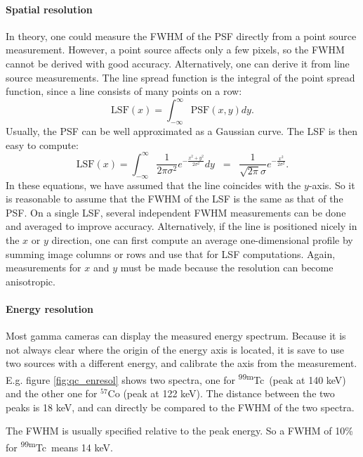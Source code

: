 \documentclass[11pt,oneside]{article}
\begin{document}
\paragraph{Spatial resolution}
In theory, one could measure the FWHM of the PSF directly from a point source
measurement. However, a point source affects only a few pixels, so the FWHM
cannot be derived with good accuracy. Alternatively, one can derive it from
line source measurements. The line spread function is the integral of the
point spread function, since a line consists of many points on a row:
\begin{equation}
  \mbox{LSF}(x) = \int_{-\infty}^{\infty} \mbox{PSF}(x,y) dy.
\end{equation}
Usually, the PSF can be well approximated as a Gaussian curve. The LSF is then
easy to compute:
\begin{equation}
  \mbox{LSF}(x)  =  \int_{-\infty}^{\infty} 
    \frac{1}{2 \pi \sigma^2} e^{- \frac{x^2 + y^2}{2 \sigma^2}} dy
 \;\; = \;\; \frac{1}{\sqrt{2 \pi} \sigma} e^{- \frac{x^2}{2 \sigma^2}}.
\end{equation}
In these equations, we have assumed that the line coincides with the
$y$-axis. So it is reasonable to assume that the FWHM of the LSF is the same
as that of the PSF.  On a single LSF, several independent FWHM measurements
can be done and averaged to improve accuracy. Alternatively, if the line is
positioned nicely in the $x$ or $y$ direction, one can first compute an
average one-dimensional profile by summing image columns or rows and use that
for LSF computations.  Again, measurements for $x$ and $y$ must be made
because the resolution can become anisotropic.

\paragraph{Energy resolution}
Most gamma cameras can display the measured energy spectrum. Because it is not
always clear where the origin of the energy axis is located, it is save to use
two sources with a different energy, and calibrate the axis from the
measurement. E.g. figure \ref{fig:qc_enresol} shows two spectra, one for
\textsuperscript{99m}Tc\ (peak at 140 keV) and the other one for $^{57}$Co (peak at 122
keV). The distance between the two peaks is 18 keV, and can directly be
compared to the FWHM of the two spectra.

The FWHM is usually specified relative to the peak energy. So a FWHM of 10\%
for \textsuperscript{99m}Tc\ means 14 keV.
\end{document}

